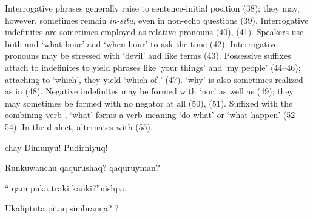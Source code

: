 {Interrogative phrases generally raise to sentence-initial position (38); they may, however, sometimes remain \emph{in-situ}, even in non-echo questions (39). Interrogative indefinites are sometimes employed as relative pronouns (40), (41). Speakers use both  and  `what hour' and `when hour' to ask the time (42). Interrogative pronouns may be stressed with  `devil' and like terms (43). Possessive suffixes attach to indefinites to yield phrases like `your things' and `my people' (44--46); attaching to  `which', they yield `which of ' (47).  `why' is also sometimes realized as  in \ACH{} (48). Negative indefinites may be formed with  `nor' as well as  (49); they may sometimes be formed with no negator at all (50), (51). Suffixed with the combining verb ,  `what' forms a verb meaning `do what' or `what happen' (52--54). In the \CH{} dialect,  alternates with  (55).

%
{\textexclamdown{} chay Dimunyu! \textexclamdown{}Pudirniyuq!}%
{}%
{}{}%

%
{\textquestiondown{}Runkuwanchu qaqurushaq? \textquestiondown{} qaquruyman?}%
{}%
{}{}%

%
{``\textquestiondown{} qam puka traki kanki?''nishpa.}%
{}%
{}{}%

%
{\textquestiondown{}Ukaliptuta pitaq simbranqa? \textquestiondown{}?}%
{}%
{}{}%

}
